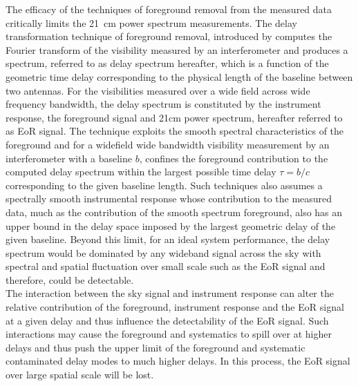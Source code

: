 \documentclass[12pt,preprint]{aastex}
\begin{document}



The efficacy of the techniques of foreground removal from the measured data critically limits the 21~cm power spectrum measurements. The delay transformation technique of foreground removal, introduced by  \citep{ParsonsBacker2009,Parsons2012} computes the Fourier transform of the visibility measured by an interferometer and produces a spectrum, referred to as delay spectrum hereafter, which is a function of the geometric time delay corresponding to the physical length of the baseline between two antennas. For the visibilities measured over a wide field across wide frequency bandwidth, the delay spectrum is constituted by the instrument response, the foreground signal and 21cm power spectrum, hereafter referred to as EoR signal.
The technique exploits the smooth spectral characteristics of the foreground and for a widefield wide bandwidth visibility measurement by an interferometer with a baseline $b$, confines the foreground contribution to the computed delay spectrum within the largest possible time delay $\tau = b/c$ corresponding to the given baseline length. Such techniques also assumes a spectrally smooth instrumental response whose contribution to the measured data, much as the contribution of the smooth spectrum foreground, also has an upper bound in the delay space imposed by the largest geometric delay of the given baseline. 
Beyond this limit, for an ideal system performance, the delay spectrum would be dominated by any wideband signal across the sky with spectral and spatial fluctuation over small scale such as the EoR signal and therefore, could be detectable.\\ 
The interaction between the sky signal and instrument response can alter the relative contribution of the foreground, instrument response and the EoR signal at a given delay and thus influence the detectability of the EoR signal. Such interactions may cause the foreground and systematics to spill over at higher delays and thus push the upper limit of the foreground and systematic contaminated delay modes to much higher delays. In this process, the EoR signal over large spatial scale will be lost.
\end{document}

